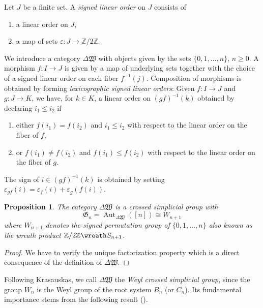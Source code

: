 \documentclass[english,11pt,leqno]{article}
\def\Gen{\mathfrak{G}}
\def\Aut{\operatorname{Aut}\nolimits}
\def\Zt{\mathbb{Z}/2\mathbb{Z}}
\def\DW{ {\Delta {\mathfrak W}}}
\newtheorem{prop}[thm]{Proposition}
\theoremstyle{definition}
\theoremstyle{remark}
\numberwithin{equation}{section}
\begin{document}
Let $J$ be a finite set. A {\em signed linear order} on $J$ consists of
\begin{enumerate}
	\item a linear order on $J$,
	\item a map of sets $\varepsilon: J \to \Zt$.
\end{enumerate}

We introduce a category $\DW$ with objects given by the sets $\{0,1,\dots,n\}$, $n \ge 0$. A
morphism $f: I \to J$ is given by a map of underlying sets together with the choice of a signed
linear order on each fiber $f^{-1}(j)$. Composition of morphisms is obtained by forming {\em
lexicographic signed linear orders}: Given $f: I \to J$ and $g: J \to K$, we have, for $k \in K$, a
linear order on $(gf)^{-1}(k)$ obtained by declaring $i_1 \le i_2$ if 
\begin{enumerate}
	\item either $f(i_1) = f(i_2)$ and $i_1 \le i_2$ with respect to the linear order on the fiber of $f$,
	\item or $f(i_1) \ne f(i_2)$ and $f(i_1) \le f(i_2)$ with respect to the linear order on the
		fiber of $g$.
\end{enumerate}
The sign of $i \in (gf)^{-1}(k)$ is obtained by setting $\varepsilon_{gf}(i) = \varepsilon_f(i) +
\varepsilon_g(f(i))$.

\begin{prop} The category $\DW$ is a crossed simplicial group with 
	\[
		\Gen_n = \Aut_{\DW}([n]) \cong W_{n+1}
	\]
	where $W_{n+1}$ denotes the signed permutation group of $\{0,1,\dots,n\}$ also known as the
	wreath product $\Zt\wreath S_{n+1}$.
\end{prop}
\begin{proof} We have to verify the unique factorization property which is a direct consequence of the
	definition of $\DW$.
\end{proof}

Following Krasauskas, we call $\DW$ the {\em Weyl crossed simplicial group}, since the group $W_{n}$
is the Weyl group of the root system $B_n$ (or $C_n$). Its fundamental importance stems
from the following result (\cite{krasauskas,fiedorowicz-loday}).
\end{document}
